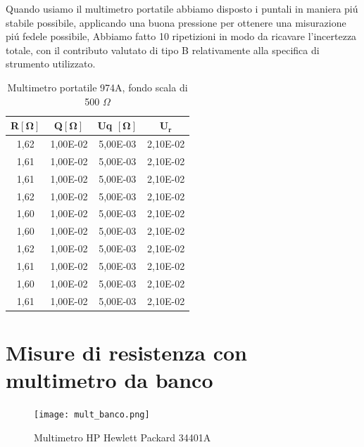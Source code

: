 Quando usiamo il multimetro portatile abbiamo disposto i puntali in maniera pi\'u stabile possibile, applicando una buona pressione per ottenere una misurazione pi\'u fedele possibile,
Abbiamo fatto 10 ripetizioni in modo da ricavare l'incertezza totale, con il contributo valutato di tipo B relativamente alla specifica di strumento utilizzato.

\begin{table}[!ht]
    \centering
    \begin{tabular}{|c|c|c|c|}
    \hline
        \textbf{R}$\bm{[\Omega]}$ & \textbf{Q}$\bm{[\Omega]}$ & \textbf{Uq} $\bm{[\Omega]}$ & $\bm{U_r}$ \\ \hline
        1,62 & 1,00E-02 & 5,00E-03 & 2,10E-02 \\ \hline
        1,61 & 1,00E-02 & 5,00E-03 & 2,10E-02 \\ \hline
        1,61 & 1,00E-02 & 5,00E-03 & 2,10E-02 \\ \hline
        1,62 & 1,00E-02 & 5,00E-03 & 2,10E-02 \\ \hline
        1,60 & 1,00E-02 & 5,00E-03 & 2,10E-02 \\ \hline
        1,60 & 1,00E-02 & 5,00E-03 & 2,10E-02 \\ \hline
        1,62 & 1,00E-02 & 5,00E-03 & 2,10E-02 \\ \hline
        1,61 & 1,00E-02 & 5,00E-03 & 2,10E-02 \\ \hline
        1,60 & 1,00E-02 & 5,00E-03 & 2,10E-02 \\ \hline
        1,61 & 1,00E-02 & 5,00E-03 & 2,10E-02 \\ \hline
    \end{tabular}
    \caption{Multimetro portatile 974A, fondo scala di 500 $\Omega$}
    \label{tab:mult_port}
\end{table}
\FloatBarrier

\vspace{4cm}
\section{Misure di resistenza con multimetro da banco}
\label{sec:mult}


\begin{figure}[h]
    \centering
    \texttt{[image: mult\_banco.png]}
    \caption{Multimetro HP Hewlett Packard 34401A}
    \label{fig:mult_banco}
\end{figure}
\FloatBarrier

